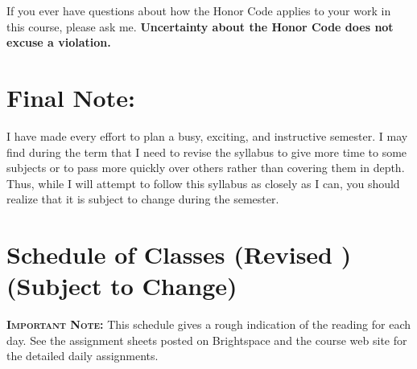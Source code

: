 \documentclass[11pt,twoside]{jgsyllabus}\usepackage[]{graphicx}\usepackage[]{xcolor}
\begin{document}
If you ever
have questions about how the Honor Code applies to your work
in this course, please ask me.
\textbf{Uncertainty about the Honor Code does not excuse a violation.}
\section{Final Note:}
I have made every effort to plan a busy, exciting, and instructive semester.
I may find during the term that I need to revise the syllabus to give more time
to some subjects or to pass more quickly over others rather than covering them
in depth.
Thus, while I will attempt to follow this syllabus as closely as I can,
you should realize that it is subject to change during the semester.
%
%
\iftrue

\fi
%
%
%
%
%
%
%

\cleardoublepage
\clearpage
\appendix
\setcounter{secnumdepth}{0}
\newcommand{\maybehline}{\hline}%
\setlength\extrarowheight{4pt}
\section[Class Schedule]{Schedule of Classes
\ifrevised
	(Revised \RevisionDate)%
\else
	(Subject to Change)%
\fi}

\textbf{\scshape Important Note:} This schedule gives a rough indication of the
reading for each day. See the assignment sheets posted on Brightspace
and the course web site for the detailed daily assignments.
\end{document}
